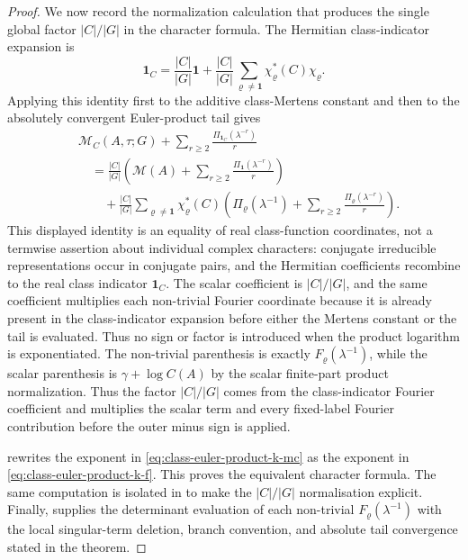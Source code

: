 \documentclass[11pt,a4paper]{amsart}
\theoremstyle{plain}
\theoremstyle{definition}
\theoremstyle{remark}
\begin{document}
\begin{proof}
  We now record the normalization calculation that produces the single
  global factor \(|C|/|G|\) in the character formula.  The Hermitian
  class-indicator expansion is
  \[
    \mathbf1_C
    =
    \frac{|C|}{|G|}\mathbf1+
    \frac{|C|}{|G|}
      \sum_{\varrho\neq\mathbf1}\chi_\varrho^\ast(C)\chi_\varrho .
  \]
  Applying this identity first to the additive class-Mertens constant and
  then to the absolutely convergent Euler-product tail gives
  \[
  \begin{aligned}
    &\mathcal M_C(A,\tau;G)+
      \sum_{r\ge2}\frac{\Pi_{\mathbf1_C}(\lambda^{-r})}{r} \\
    &\quad=
      \frac{|C|}{|G|}
      \left(
        \mathcal M(A)+\sum_{r\ge2}\frac{\Pi_{\mathbf1}(\lambda^{-r})}{r}
      \right) \\
    &\qquad+
      \frac{|C|}{|G|}
      \sum_{\varrho\neq\mathbf1}\chi_\varrho^\ast(C)
      \left(
        \Pi_\varrho(\lambda^{-1})+
        \sum_{r\ge2}\frac{\Pi_\varrho(\lambda^{-r})}{r}
      \right).
  \end{aligned}
  \]
  This displayed identity is an equality of real class-function coordinates,
  not a termwise assertion about individual complex characters: conjugate
  irreducible representations occur in conjugate pairs, and the Hermitian
  coefficients recombine to the real class indicator \(\mathbf1_C\).  The
  scalar coefficient is \(|C|/|G|\), and the same coefficient multiplies each
  non-trivial Fourier coordinate because it is already present in the
  class-indicator expansion before either the Mertens constant or the tail is
  evaluated.  Thus no sign or factor is introduced when the product logarithm
  is exponentiated.
  The non-trivial parenthesis is exactly
  \(F_\varrho(\lambda^{-1})\), while the scalar parenthesis is
  \(\gamma+\log C(A)\) by the scalar finite-part product normalization.
  Thus the factor \(|C|/|G|\) comes from the class-indicator Fourier
  coefficient and multiplies the scalar term and every fixed-label Fourier
  contribution before the outer minus sign is applied.

   rewrites the exponent in
  \eqref{eq:class-euler-product-k-mc} as the exponent in
  \eqref{eq:class-euler-product-k-f}. This proves the equivalent
  character formula.  The same computation is isolated in
    to make the
   \(|C|/|G|\) normalisation explicit.  Finally,
    supplies the determinant
   evaluation of each non-trivial \(F_\varrho(\lambda^{-1})\) with the local
   singular-term deletion, branch convention, and absolute tail convergence
   stated in the theorem.
\end{proof}
\end{document}
